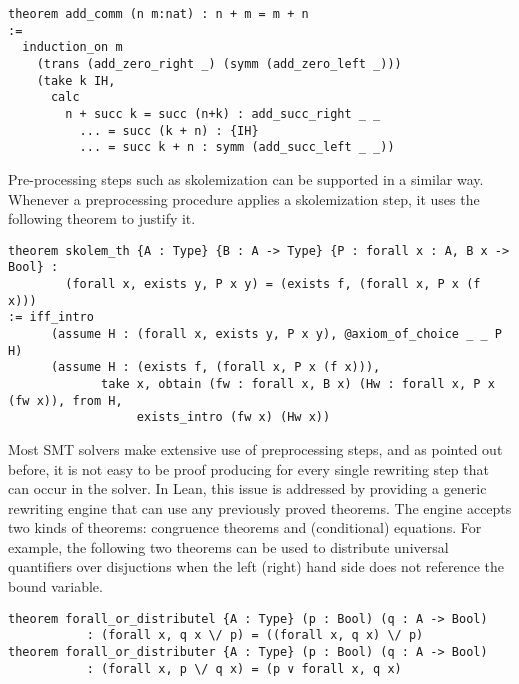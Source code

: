 \documentclass{llncs}
\begin{document}
{\scriptsize
\begin{verbatim}
theorem add_comm (n m:nat) : n + m = m + n
:=
  induction_on m
    (trans (add_zero_right _) (symm (add_zero_left _)))
    (take k IH,
      calc
        n + succ k = succ (n+k) : add_succ_right _ _
          ... = succ (k + n) : {IH}
          ... = succ k + n : symm (add_succ_left _ _))
\end{verbatim}
}

Pre-processing steps such as skolemization can be supported in
a similar way. Whenever a preprocessing procedure applies a
skolemization step, it uses the following theorem to justify it.

{\scriptsize
\begin{verbatim}
theorem skolem_th {A : Type} {B : A -> Type} {P : forall x : A, B x -> Bool} :
        (forall x, exists y, P x y) = (exists f, (forall x, P x (f x)))
:= iff_intro
      (assume H : (forall x, exists y, P x y), @axiom_of_choice _ _ P H)
      (assume H : (exists f, (forall x, P x (f x))),
             take x, obtain (fw : forall x, B x) (Hw : forall x, P x (fw x)), from H,
                  exists_intro (fw x) (Hw x))
\end{verbatim}
}

Most SMT solvers make extensive use of preprocessing steps, and as
pointed out before, it is not easy to be proof producing for every
single rewriting step that can occur in the solver.
In Lean, this issue is addressed by providing a generic rewriting
engine that can use any previously proved theorems. The engine
accepts two kinds of theorems: congruence theorems and (conditional)
equations. For example, the following two theorems can be used to
distribute universal quantifiers over disjuctions when the left
(right) hand side does not reference the bound variable.

{\scriptsize
\begin{verbatim}
theorem forall_or_distributel {A : Type} (p : Bool) (q : A -> Bool)
           : (forall x, q x \/ p) = ((forall x, q x) \/ p)
theorem forall_or_distributer {A : Type} (p : Bool) (q : A -> Bool)
           : (forall x, p \/ q x) = (p ∨ forall x, q x)
\end{verbatim}
}


\end{document}
